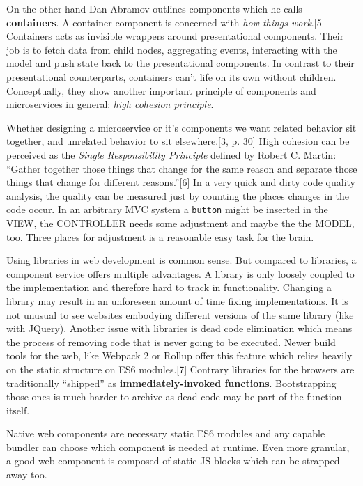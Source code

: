 \documentclass[]{assets/latex/ieee}
\begin{document}
On the other hand Dan Abramov outlines components which he calls
\textbf{containers}. A container component is concerned with \emph{how
things work}.{[}5{]} Containers acts as invisible wrappers around
presentational components. Their job is to fetch data from child nodes,
aggregating events, interacting with the model and push state back to
the presentational components. In contrast to their presentational
counterparts, containers can't life on its own without children.
Conceptually, they show another important principle of components and
microservices in general: \emph{high cohesion principle}.

Whether designing a microservice or it's components we want related
behavior sit together, and unrelated behavior to sit elsewhere.{[}3, p.
30{]} High cohesion can be perceived as the \emph{Single Responsibility
Principle} defined by Robert C. Martin: ``Gather together those things
that change for the same reason and separate those things that change
for different reasons.''{[}6{]} In a very quick and dirty code quality
analysis, the quality can be measured just by counting the places
changes in the code occur. In an arbitrary MVC system a \texttt{button}
might be inserted in the VIEW, the CONTROLLER needs some adjustment and
maybe the the MODEL, too. Three places for adjustment is a reasonable
easy task for the brain.

Using libraries in web development is common sense. But compared to
libraries, a component service offers multiple advantages. A library is
only loosely coupled to the implementation and therefore hard to track
in functionality. Changing a library may result in an unforeseen amount
of time fixing implementations. It is not unusual to see websites
embodying different versions of the same library (like with JQuery).
Another issue with libraries is dead code elimination which means the
process of removing code that is never going to be executed. Newer build
tools for the web, like Webpack 2 or Rollup offer this feature which
relies heavily on the static structure on ES6 modules.{[}7{]} Contrary
libraries for the browsers are traditionally ``shipped'' as
\textbf{immediately-invoked functions}. Bootstrapping those ones is much
harder to archive as dead code may be part of the function itself.

Native web components are necessary static ES6 modules and any capable
bundler can choose which component is needed at runtime. Even more
granular, a good web component is composed of static JS blocks which can
be strapped away too.
\end{document}
